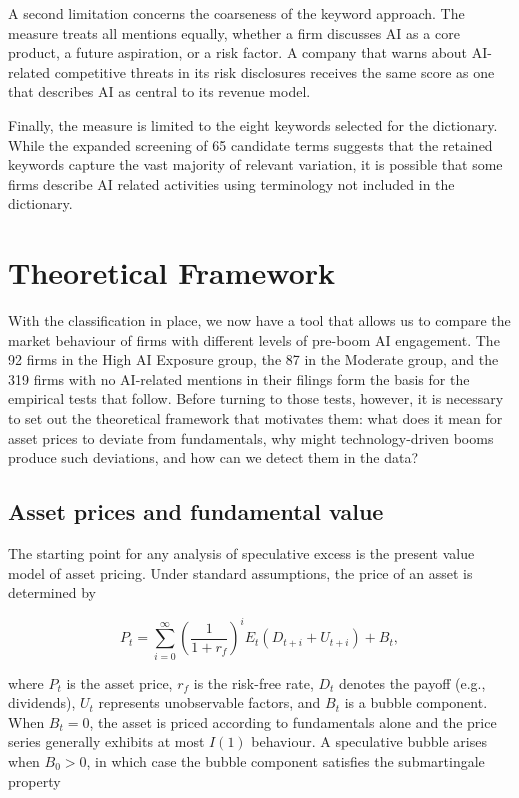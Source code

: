 \documentclass[12pt,a4paper]{article}
\begin{document}
A second limitation concerns the coarseness of the keyword approach. The measure treats all mentions equally, whether a firm discusses AI as a core product, a future aspiration, or a risk factor. A company that warns about AI-related competitive threats in its risk disclosures receives the same score as one that describes AI as central to its revenue model.

Finally, the measure is limited to the eight keywords selected for the dictionary. While the expanded screening of 65 candidate terms suggests that the retained keywords capture the vast majority of relevant variation, it is possible that some firms describe AI related activities using terminology not included in the dictionary. 


\section{Theoretical Framework}

With the classification in place, we now have a tool that allows us to compare the market behaviour of firms with different levels of pre-boom AI engagement. The 92 firms in the High AI Exposure group, the 87 in the Moderate group, and the 319 firms with no AI-related mentions in their filings form the basis for the empirical tests that follow. Before turning to those tests, however, it is necessary to set out the theoretical framework that motivates them: what does it mean for asset prices to deviate from fundamentals, why might technology-driven booms produce such deviations, and how can we detect them in the data?

\subsection{Asset prices and fundamental value}

The starting point for any analysis of speculative excess is the present value model of asset pricing. Under standard assumptions, the price of an asset is determined by

\begin{equation}
P_t = \sum_{i=0}^{\infty} \left( \frac{1}{1+r_f} \right)^i E_t \left( D_{t+i} + U_{t+i} \right) + B_t,
\end{equation}

\noindent where $P_t$ is the asset price, $r_f$ is the risk-free rate, $D_t$ denotes the payoff (e.g., dividends), $U_t$ represents unobservable factors, and $B_t$ is a bubble component. When $B_t = 0$, the asset is priced according to fundamentals alone and the price series generally exhibits at most $I(1)$ behaviour. A speculative bubble arises when $B_0 > 0$, in which case the bubble component satisfies the submartingale property
\end{document}
